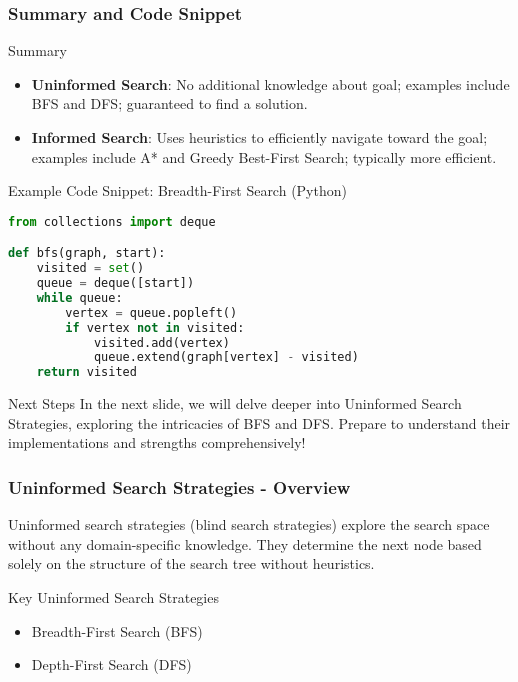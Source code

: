 \documentclass[aspectratio=169]{beamer}
\begin{document}
\begin{frame}[fragile]
    \frametitle{Summary and Code Snippet}
    \begin{block}{Summary}
        \begin{itemize}
            \item \textbf{Uninformed Search}: No additional knowledge about goal; examples include BFS and DFS; guaranteed to find a solution.
            \item \textbf{Informed Search}: Uses heuristics to efficiently navigate toward the goal; examples include A* and Greedy Best-First Search; typically more efficient.
        \end{itemize}
    \end{block}
    
    \begin{block}{Example Code Snippet: Breadth-First Search (Python)}
    \begin{lstlisting}[language=Python]
from collections import deque

def bfs(graph, start):
    visited = set()
    queue = deque([start])
    while queue:
        vertex = queue.popleft()
        if vertex not in visited:
            visited.add(vertex)
            queue.extend(graph[vertex] - visited)
    return visited
    \end{lstlisting}
    \end{block}
    
    \begin{block}{Next Steps}
        In the next slide, we will delve deeper into Uninformed Search Strategies, exploring the intricacies of BFS and DFS. Prepare to understand their implementations and strengths comprehensively!
    \end{block}
\end{frame}

\begin{frame}[fragile]
  \frametitle{Uninformed Search Strategies - Overview}
  Uninformed search strategies (blind search strategies) explore the search space without any domain-specific knowledge. They determine the next node based solely on the structure of the search tree without heuristics.

  \begin{block}{Key Uninformed Search Strategies}
    \begin{itemize}
      \item Breadth-First Search (BFS)
      \item Depth-First Search (DFS)
    \end{itemize}
  \end{block}
\end{frame}
\end{document}
